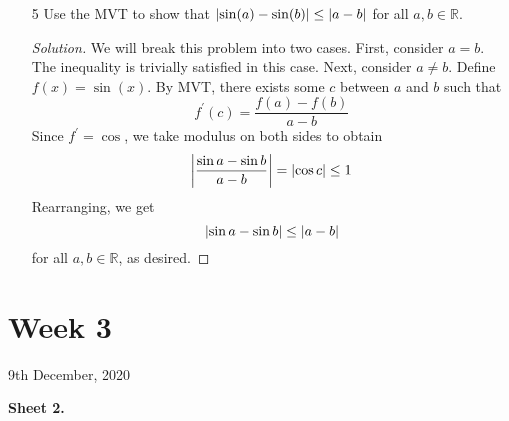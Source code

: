 \documentclass[12pt]{article}
\theoremstyle{definition}
\newenvironment{soln}{\begin{proof}[Solution]}{\end{proof}}
\begin{document}
\begin{enumerate}[leftmargin=*]
    \item[5] Use the MVT to show that $\abs{\sin(a) - \sin(b)} \leq \abs{a-b}$ for all $a,b \in \mathbb{R}$. 
    \begin{soln}
        We will break this problem into two cases. First, consider $a = b$. The inequality is trivially satisfied in this case. 
        Next, consider $a \neq b$. Define $f(x) = \sin(x)$. By MVT, there exists some $c$ between $a$ and $b$ such that
        \[
            f^{\prime}(c) = \frac{f(a) - f(b)}{a-b}
        \]
        Since $f^{\prime} = \cos$, we take modulus on both sides to obtain
        \[
            \abs{\frac{\sin a - \sin b}{a - b}} = \abs{\cos c} \leq 1
        \]  
        Rearranging, we get
        \[
            \abs{\sin a - \sin b} \leq \abs{a - b}
        \]
        for all $a,b \in \mathbb{R}$, as desired.
    \end{soln}
\end{enumerate}

\newpage\section{Week 3}
\begin{center}
	9th December, 2020
\end{center}
\textbf{Sheet 2.}
\end{document}
